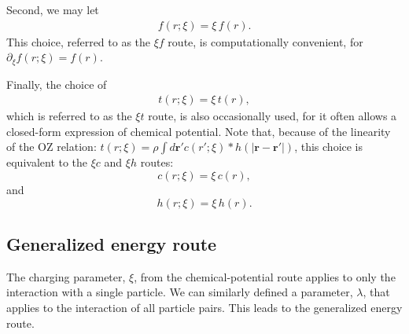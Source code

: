 \documentclass[aip,jcp,reprint,superscriptaddress]{revtex4-1}
\newcommand{\vct}[1]{\mathbf{#1}}
\providecommand{\vr}{} %
\renewcommand{\vr}{\vct{r}}
\begin{document}
Second,
we may let
%
\begin{align}
f(r; \xi)
=
\xi \, f(r).
\label{eq:xi_f}
\end{align}
This choice,
referred to as the $\xi f$ route,
is computationally convenient,
for $\partial_\xi f(r; \xi) = f(r)$.



Finally,
the choice of
%
\begin{align}
t(r; \xi)
=
\xi \, t(r),
\label{eq:xi_t}
\end{align}
%
which is referred to as the $\xi t$ route,
is also occasionally used,
for it often allows
a closed-form expression of
chemical potential\cite{
attard1991}.
%
Note that,
because of the linearity
of the OZ relation:
$t(r; \xi) =
\rho \int d\vr' c(r'; \xi) *
h(|\vr - \vr'|)$,
this choice is equivalent to
the $\xi c$ and $\xi h$ routes:
\[
c(r; \xi)
=
\xi \, c(r),
\]
and
\[
h(r; \xi)
=
\xi \, h(r).
\]





\subsection{
\label{sec:eroute}
Generalized energy route}



\newcommand{\eps}{\varepsilon^\mathrm{ex}}
\newcommand{\Eps}{\mathcal E}
\newcommand{\U}{\mathcal U}



The charging parameter, $\xi$,
from the chemical-potential route
applies to only
the interaction with a single particle.
%
We can similarly defined a parameter, $\lambda$,
that applies to the interaction of
all particle pairs.
%
This leads to the generalized energy route.
\end{document}
